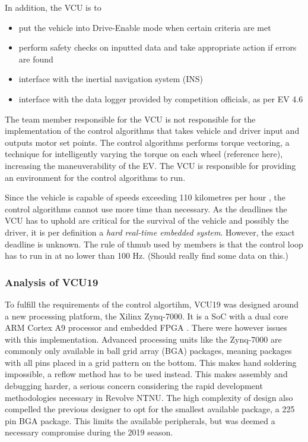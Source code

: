 In addition, the VCU is to
\begin{itemize}
    \item put the vehicle into Drive-Enable mode when certain criteria are met
    \item perform safety checks on inputted data and take appropriate action if errors are found
    \item interface with the inertial navigation system (INS)
    \item interface with the data logger provided by competition officials, as per EV 4.6 \cite{fsgrules}
\end{itemize}

The team member responsible for the VCU is not responsible for the implementation of the control algorithms that takes vehicle and driver input and outputs motor set points. The control algorithms performs torque vectoring, a technique for intelligently varying the torque on each wheel {\color{red}(reference here)}, increasing the maneuverability of the EV. The VCU is responsible for providing an environment for the control algorithms to run.

Since the vehicle is capable of speeds exceeding 110 kilometres per hour \cite{novaspeed}, the control algorithms cannot use more time than necessary. As the deadlines the VCU has to uphold are critical for the survival of the vehicle and possibly the driver, it is per definition a \emph{hard real-time embedded system}. However, the exact deadline is unknown. The rule of thmub used by members is that the control loop has to run in at no lower than 100 \si{\hertz}. {\color{red}(Should really find some data on this.)}

\subsubsection{Analysis of VCU19}

To fulfill the requirements of the control algortihm, VCU19 was designed around a new processing platform, the Xilinx Zynq-7000. It is a SoC with a dual core ARM Cortex A9 processor and embedded FPGA \cite{zynq}. There were however issues with this implementation. Advanced processing units like the Zynq-7000 are commonly only available in ball grid array (BGA) packages, meaning packages with all pins placed in a grid pattern on the bottom. This makes hand soldering impossible, a reflow method has to be used instead. This makes assembly and debugging harder, a serious concern considering the rapid development methodologies necessary in Revolve NTNU. The high complexity of design also compelled the previous designer to opt for the smallest available package, a 225 pin BGA package. This limits the available peripherals, but was deemed a necessary compromise during the 2019 season.





